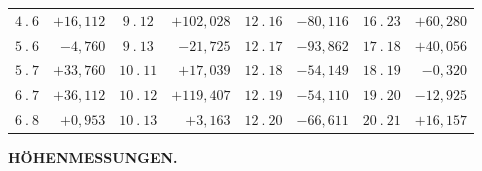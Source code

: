 {\begin{tabular}{|c|r||c|r||c|r||c|r|}
\(4\ .\ 6\) & \(+16{,}112\) & \(9\ .\ 12\) & \(+102{,}028\) & \(12\ .\ 16\) & \(-80{,}116\) & \(16\ .\ 23\) & \(+60{,}280\)\\
\(5\ .\ 6\) & \(-4{,}760\) & \(9\ .\ 13\) & \(-21{,}725\) & \(12\ .\ 17\) & \(-93{,}862\) & \(17\ .\ 18\) & \(+40{,}056\)\\
\(5\ .\ 7\) & \(+33{,}760\) & \(10\ .\ 11\) & \(+17{,}039\) & \(12\ .\ 18\) & \(-54{,}149\) & \(18\ .\ 19\) & \(-0{,}320\)\\
\(6\ .\ 7\) & \(+36{,}112\) & \(10\ .\ 12\) & \(+119{,}407\) & \(12\ .\ 19\) & \(-54{,}110\) & \(19\ .\ 20\) & \(-12{,}925\)\\
\(6\ .\ 8\) & \(+0{,}953\) & \(10\ .\ 13\) & \(+3{,}163\) & \(12\ .\ 20\) & \(-66{,}611\) & \(20\ .\ 21\) & \(+16{,}157\)\\
\end{tabular}\par}

\par\clearpage
\noindent\null\hfill{\small\textbf{HÖHENMESSUNGEN.}}\hfill{}\par\medskip

